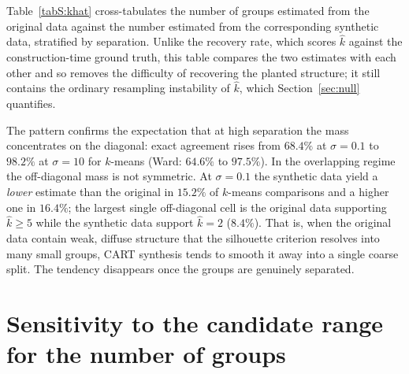 \documentclass[pdflatex,referee]{sn-jnl}
\begin{document}
Table~\ref{tabS:khat} cross-tabulates the number of groups estimated from the
original data against the number estimated from the corresponding synthetic
data, stratified by separation. Unlike the recovery rate, which scores
$\hat{k}$ against the construction-time ground truth, this table compares the
two estimates with each other and so removes the difficulty of recovering the
planted structure; it still contains the ordinary resampling instability of
$\hat{k}$, which Section~\ref{sec:null} quantifies.

The pattern confirms the expectation that at high separation the mass
concentrates on the diagonal: exact agreement rises from $68.4\%$ at
$\sigma = 0.1$ to $98.2\%$ at $\sigma = 10$ for $k$-means (Ward: $64.6\%$ to
$97.5\%$). In the overlapping regime the off-diagonal mass is not symmetric.
At $\sigma = 0.1$ the synthetic data yield a \emph{lower} estimate than the
original in $15.2\%$ of $k$-means comparisons and a higher one in $16.4\%$; the largest
single off-diagonal cell is the original data supporting $\hat{k} \ge 5$ while
the synthetic data support $\hat{k} = 2$ ($8.4\%$). That is, when the original
data contain weak, diffuse structure that the silhouette criterion resolves
into many small groups, CART synthesis tends to smooth it away into a single
coarse split. The tendency disappears once the groups are genuinely separated.

\begin{table}[!htbp]
\centering
\caption{Agreement in the estimated number of groups between original and
  synthetic data, by separation. Rows are $\hat{k}$ from the original data,
  columns $\hat{k}$ from the synthetic data; cells are percentages of all
  comparisons at that separation (each block sums to $100\%$). Estimates of
  five or more groups are pooled for display, but the agreement column is
  computed on unpooled values. Both data sources are searched over the fixed
  range $\hat{k} \in \{2,\dots,8\}$ used in the main article; under the capped
  range $\{2,\dots,\min(k+3,8)\}$ of Section~\ref{sec:range}, agreement is
  higher in the overlapping regime ($75.1\%$ and $67.6\%$ at $\sigma = 0.1$,
  $79.7\%$ and $75.9\%$ at $\sigma = 2$, for $k$-means and Ward respectively)
  and essentially unchanged at $\sigma \ge 6$, where the two conventions
  differ by at most $0.1$ percentage points. $n = 180{,}000$ comparisons per
  separation level.}
\label{tabS:khat}
\small

\end{table}

\section{Sensitivity to the candidate range for the number of groups}
\label{sec:range}
\end{document}
